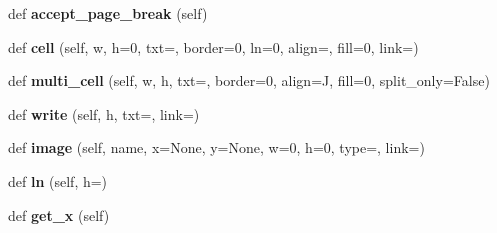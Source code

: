 \begin{DoxyCompactItemize}
\item 
def {\bfseries accept\+\_\+page\+\_\+break} (self)\hypertarget{class_libraries_1_1fpdf_1_1fpdf_1_1_f_p_d_f_a04819be947fef247e62bed87e9bcd525}{}\label{class_libraries_1_1fpdf_1_1fpdf_1_1_f_p_d_f_a04819be947fef247e62bed87e9bcd525}

\item 
def {\bfseries cell} (self, w, h=0, txt=\textquotesingle{}\textquotesingle{}, border=0, ln=0, align=\textquotesingle{}\textquotesingle{}, fill=0, link=\textquotesingle{}\textquotesingle{})\hypertarget{class_libraries_1_1fpdf_1_1fpdf_1_1_f_p_d_f_a8668a1caa192a9b96f4043a40b1d4968}{}\label{class_libraries_1_1fpdf_1_1fpdf_1_1_f_p_d_f_a8668a1caa192a9b96f4043a40b1d4968}

\item 
def {\bfseries multi\+\_\+cell} (self, w, h, txt=\textquotesingle{}\textquotesingle{}, border=0, align=\textquotesingle{}J\textquotesingle{}, fill=0, split\+\_\+only=False)\hypertarget{class_libraries_1_1fpdf_1_1fpdf_1_1_f_p_d_f_a82bc2af0ee8d4168d4c01d465bd13ed6}{}\label{class_libraries_1_1fpdf_1_1fpdf_1_1_f_p_d_f_a82bc2af0ee8d4168d4c01d465bd13ed6}

\item 
def {\bfseries write} (self, h, txt=\textquotesingle{}\textquotesingle{}, link=\textquotesingle{}\textquotesingle{})\hypertarget{class_libraries_1_1fpdf_1_1fpdf_1_1_f_p_d_f_a5da0c019c7790c0f4b078bf4d04b3bcb}{}\label{class_libraries_1_1fpdf_1_1fpdf_1_1_f_p_d_f_a5da0c019c7790c0f4b078bf4d04b3bcb}

\item 
def {\bfseries image} (self, name, x=None, y=None, w=0, h=0, type=\textquotesingle{}\textquotesingle{}, link=\textquotesingle{}\textquotesingle{})\hypertarget{class_libraries_1_1fpdf_1_1fpdf_1_1_f_p_d_f_ace1b0735c2b8cd9eb021978465fe05fa}{}\label{class_libraries_1_1fpdf_1_1fpdf_1_1_f_p_d_f_ace1b0735c2b8cd9eb021978465fe05fa}

\item 
def {\bfseries ln} (self, h=\textquotesingle{}\textquotesingle{})\hypertarget{class_libraries_1_1fpdf_1_1fpdf_1_1_f_p_d_f_a185e98fc3999871e176b0e46d2b87603}{}\label{class_libraries_1_1fpdf_1_1fpdf_1_1_f_p_d_f_a185e98fc3999871e176b0e46d2b87603}

\item 
def {\bfseries get\+\_\+x} (self)\hypertarget{class_libraries_1_1fpdf_1_1fpdf_1_1_f_p_d_f_a1e20e527aae603339de81840a41c4ac5}{}\label{class_libraries_1_1fpdf_1_1fpdf_1_1_f_p_d_f_a1e20e527aae603339de81840a41c4ac5}


\end{DoxyCompactItemize}

